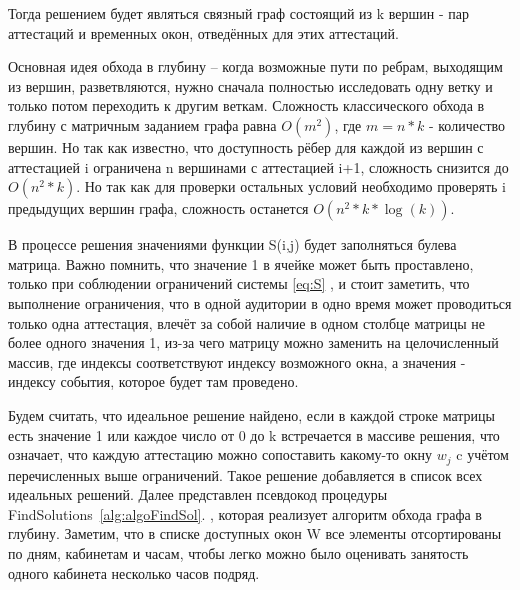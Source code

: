 Тогда решением будет являться связный граф состоящий из k вершин - пар аттестаций и временных окон, отведённых для этих аттестаций.

Основная идея обхода в глубину – когда возможные пути по ребрам, выходящим из вершин, разветвляются, нужно сначала полностью исследовать одну ветку и только потом переходить к другим веткам. Сложность классического обхода в глубину с матричным заданием графа равна ${O(m^2)}$, где {$m=n*k$} - количество вершин. Но так как известно, что доступность рёбер для каждой из вершин с аттестацией i ограничена n вершинами с аттестацией i+1, сложность снизится до ${O(n^2 * k)}$. Но так как для проверки остальных условий необходимо проверять i предыдущих вершин графа, сложность останется ${O(n^2 * k*\log(k))}$.

В процессе решения значениями функции S(i,j) будет заполняться булева матрица. Важно помнить, что значение 1 в ячейке может быть проставлено, только при соблюдении ограничений системы \eqref{eq:S} , и стоит заметить, что выполнение ограничения, что в одной аудитории в одно время может проводиться только одна аттестация, влечёт за собой наличие в одном столбце матрицы не более одного значения 1, из-за чего матрицу можно заменить на целочисленный массив, где индексы соответствуют индексу возможного окна, а значения - индексу события, которое будет там проведено.

Будем считать, что идеальное решение найдено, если в каждой строке матрицы есть значение 1 или каждое число от 0 до k встречается в массиве решения, что означает, что каждую аттестацию можно сопоставить какому-то окну ${w_j}$ c учётом перечисленных выше ограничений. Такое решение добавляется в список всех идеальных решений. Далее представлен псевдокод процедуры FindSolutions~\ref{alg:algoFindSol}. , которая реализует алгоритм обхода графа в глубину. Заметим, что в списке доступных окон W все элементы отсортированы по дням, кабинетам и часам, чтобы легко можно было оценивать занятость одного кабинета несколько часов подряд.

